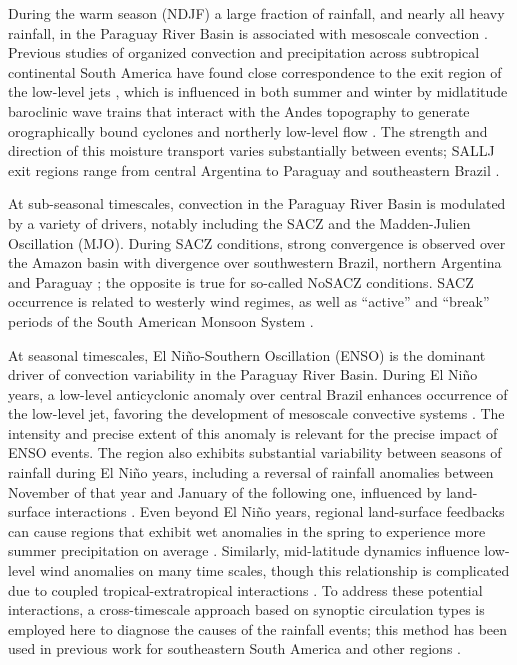 \documentclass{ametsoc}
\begin{document}
During the warm season (NDJF) a large fraction of rainfall, and nearly all heavy rainfall, in the Paraguay River Basin is associated with mesoscale convection \citep{Velasco1987}.
Previous studies of organized convection and precipitation across subtropical continental South America have found close correspondence to the exit region of the low-level jets \citep{Saulo:2007km,Salio:2007gd,Marengo2004,Velasco1987}, which is influenced in both summer and winter by midlatitude baroclinic wave trains that interact with the Andes topography to generate orographically bound cyclones and northerly low-level flow \citep{Campetella:2002hx,Seluchi:2006bi,Boers:2014gt}.
The strength and direction of this moisture transport varies substantially between events; SALLJ exit regions range from central Argentina \citep[``Chaco Jet Events'';][]{Salio:2002ev} to Paraguay and southeastern Brazil \citep[``No-Chaco Jet Events'';][]{Vera:2006ib}.

At sub-seasonal timescales, convection in the Paraguay River Basin is modulated by a variety of drivers, notably including the SACZ and the Madden-Julien Oscillation (MJO).
During SACZ conditions, strong convergence is observed over the Amazon basin with divergence over southwestern Brazil, northern Argentina and Paraguay \citep{Herdies:2002jy,Carvalho2010}; the opposite is true for so-called NoSACZ conditions.
SACZ occurrence is related to westerly wind regimes, as well as ``active'' and ``break'' periods of the South American Monsoon System \citep{Marengo2004}.

At seasonal timescales, El Ni\~no-Southern Oscillation (ENSO) is the dominant driver of convection variability in the Paraguay River Basin.
During El Ni\~no years, a low-level anticyclonic anomaly over central Brazil enhances occurrence of the low-level jet, favoring the development of mesoscale convective systems \citep{Velasco1987}.
The intensity and precise extent of this anomaly is relevant for the precise impact of ENSO events.
The region also exhibits substantial variability between seasons of rainfall during El Ni\~no years, including a reversal of rainfall anomalies between November of that year and January of the following one, influenced by land-surface interactions \citep{Grimm2009,Grimm2003}.
Even beyond El Ni\~no years, regional land-surface feedbacks can cause regions that exhibit wet anomalies in the spring to experience more summer precipitation on average \citep{Grimm:2009bq}.
Similarly, mid-latitude dynamics influence low-level wind anomalies on many time scales, though this relationship is complicated due to coupled tropical-extratropical interactions \citep{Carvalho2004,Jones2002}.
To address these potential interactions, a cross-timescale approach based on synoptic circulation types is employed here to diagnose the causes of the rainfall events; this method has been used in previous work for southeastern South America \citep{Munoz2015,Munoz2016} and other regions \citep{Moron2015}.
\end{document}
